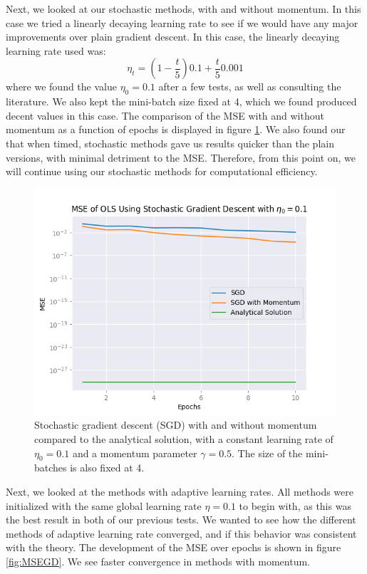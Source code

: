 Next, we looked at our stochastic methods, with and without momentum. In this case we tried a linearly decaying learning rate to see if we would have any major improvements over plain gradient descent. In this case, the linearly decaying learning rate used was:
\[
\eta_t = (1- \frac{t}{5})0.1 + \frac{t}{5} 0.001
\]
where we found the value $\eta_0 = 0.1$ after a few tests, as well as consulting the literature. We also kept the mini-batch size fixed at 4, which we found produced decent values in this case. The comparison of the MSE with and without momentum as a function of epochs is displayed in figure \ref{fig:sgdVSanalytical}. We also found our that when timed, stochastic methods gave us results quicker than the plain versions, with minimal detriment to the MSE. Therefore, from this point on, we will continue using our stochastic methods for computational efficiency.
\begin{figure}
    \centering
    \includegraphics[width=\linewidth]{figures/all_plots/sgd_mse_pr_epoch_eta_1e-1.png}
    \caption{Stochastic gradient descent (SGD) with and without momentum compared to the analytical solution, with a constant learning rate of $\eta_0 = 0.1$ and a momentum parameter $\gamma = 0.5$. The size of the mini-batches is also fixed at 4.}
    \label{fig:sgdVSanalytical}
\end{figure}

Next, we looked at the methods with adaptive learning rates. All methods were initialized with the same global learning rate $\eta = 0.1$ to begin with, as this was the best result in both of our previous tests. We wanted to see how the different methods of adaptive learning rate converged, and if this behavior was consistent with the theory. The development of the MSE over epochs is shown in figure \ref{fig:MSEGD}. We see faster convergence in methods with momentum.

